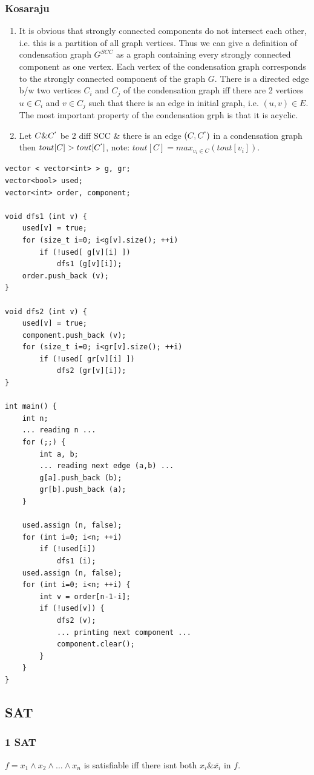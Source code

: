 \documentclass[8pt, a4paper, oneside, twocolumn]{extarticle}
\begin{document}
\subsubsection{Kosaraju}
\begin{enumerate}
    \item It is obvious that strongly connected components do not intersect each other, i.e. this is a partition of all graph vertices. Thus we can give a definition of condensation graph $G^{SCC}$ as a graph containing every strongly connected component as one vertex. Each vertex of the condensation graph corresponds to the strongly connected component of the graph $G$. There is a directed edge b/w two vertices $C_i$ and $C_j$ of the condensation graph iff there are 2 vertices $u \in C_i$ and $v \in C_j$ such that there is an edge in initial graph, i.e. $(u, v) \in E$. The most important property of the condensation grph is that it is acyclic.
    \item Let $C \& C^`$ be 2 diff SCC \& there is an edge $(C, C^`)$ in a condensation graph then $tout[C] > tout[C^`]$, note: $tout[C] = max_{v_i \in C}(tout[v_i])$.
\end{enumerate}
\begin{verbatim}
vector < vector<int> > g, gr;
vector<bool> used;
vector<int> order, component;

void dfs1 (int v) {
    used[v] = true;
    for (size_t i=0; i<g[v].size(); ++i)
        if (!used[ g[v][i] ])
            dfs1 (g[v][i]);
    order.push_back (v);
}

void dfs2 (int v) {
    used[v] = true;
    component.push_back (v);
    for (size_t i=0; i<gr[v].size(); ++i)
        if (!used[ gr[v][i] ])
            dfs2 (gr[v][i]);
}

int main() {
    int n;
    ... reading n ...
    for (;;) {
        int a, b;
        ... reading next edge (a,b) ...
        g[a].push_back (b);
        gr[b].push_back (a);
    }

    used.assign (n, false);
    for (int i=0; i<n; ++i)
        if (!used[i])
            dfs1 (i);
    used.assign (n, false);
    for (int i=0; i<n; ++i) {
        int v = order[n-1-i];
        if (!used[v]) {
            dfs2 (v);
            ... printing next component ...
            component.clear();
        }
    }
}
\end{verbatim}
\subsection{SAT}
\subsubsection{1 SAT}
$f = x_1 \wedge x_2 \wedge \dots \wedge x_n$ is satisfiable iff there isnt both $x_i \& \bar{x_i}$ in $f$.
\end{document}
